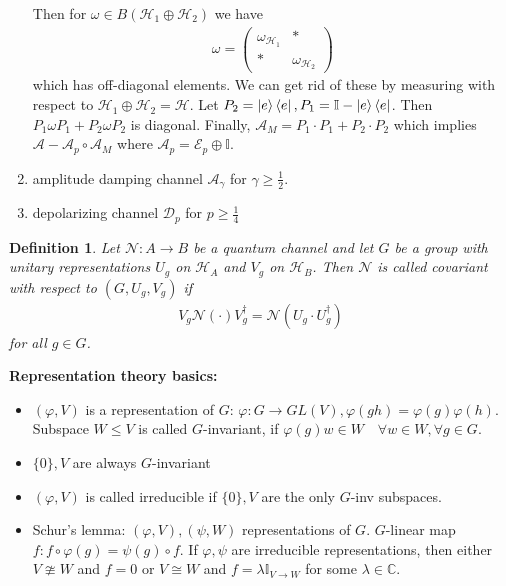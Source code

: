 \documentclass[10pt,oneside,longbibliography]{report}
\newtheorem{definition}{Definition}[section]
\begin{document}
\begin{enumerate}
    Then for $\omega \in B(\mathcal{H}_1 \oplus \mathcal{H}_2)$ we have 
    \begin{align}
        \omega = \begin{pmatrix}
        \omega_{\mathcal{H}_1} & * \\
        * & \omega_{\mathcal{H}_2}
        \end{pmatrix}
    \end{align}
    which has off-diagonal elements. We can get rid of these by measuring with respect to $\mathcal{H}_1 \oplus \mathcal{H}_2 = \mathcal{H}$. Let $P_2 = \ket{e}\bra{e}, P_1 = \mathbb{I}-\ket{e}\bra{e}$. Then $P_1 \omega P_1 + P_2 \omega P_2$ is diagonal. Finally, $\mathcal{A}_M = P_1 \cdot P_1 + P_2 \cdot P_2$ which implies $\mathcal{A}- \mathcal{A}_p \circ \mathcal{A}_M$ where $\mathcal{A}_p = \mathcal{E}_p \oplus \mathbb{I}$. 
    \item amplitude damping channel $\mathcal{A}_{\gamma}$ for $\gamma \geq \frac{1}{2}$. 
    \item depolarizing channel $\mathcal{D}_p$ for $p \geq \frac{1}{4}$
\end{enumerate}

\begin{definition}
Let $\mathcal{N}: A \rightarrow B$ be a quantum channel and let $G$ be a group with unitary representations $U_{g}$ on $\mathcal{H}_A$ and $V_{g}$ on $\mathcal{H}_B$. Then $\mathcal{N}$ is called covariant with respect to $(G,U_g,V_g)$ if 
\begin{align}
    V_{g} \mathcal{N}(\cdot) V_g^{\dagger} = \mathcal{N}(U_g \cdot U_g^{\dagger})
\end{align}
for all $g\in G$.
\end{definition}

\noindent \textbf{Representation theory basics:}
\begin{itemize}
    \item $(\varphi,V)$ is a representation of $G$: $\varphi: G \rightarrow GL(V), \varphi(gh)=\varphi(g) \varphi(h)$. Subspace $W\leq V$ is called $G$-invariant, if $\varphi (g) w \in W \quad \forall w \in W, \forall g \in G$.
    \item $\{0\},V$ are always $G$-invariant
    \item $(\varphi, V)$ is called irreducible if $\{0\},V$ are the only $G$-inv subspaces.
    \item Schur's lemma: $(\varphi,V), (\psi,W)$ representations of $G$. $G$-linear map $f: f \circ \varphi(g)=\psi(g) \circ f$. If $\varphi,\psi$ are irreducible representations, then either $V \ncong W$ and $f=0$ or $V\cong W$ and $f=\lambda \mathbb{I}_{V\rightarrow W}$ for some $\lambda \in \mathbb{C}.$
\end{itemize}
\end{document}
